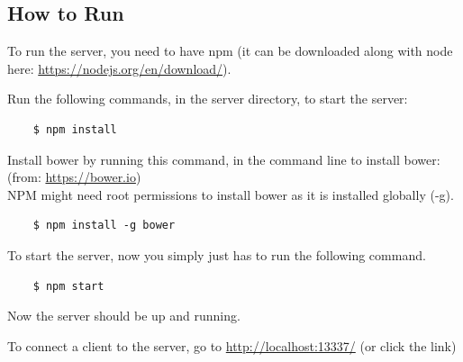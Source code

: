 \documentclass[a4paper]{article}
\begin{document}
\begin{appendices}
\section{How to Run}
\label{app_h2r}
To run the server, you need to have npm (it can be downloaded along with
  node here: \url{https://nodejs.org/en/download/}).

Run the following commands, in the server directory, to start the server:
\begin{verbatim}
	$ npm install
\end{verbatim}
  
Install bower by running this command, in the command line to install
bower: (from: \url{https://bower.io})\\
NPM might need root permissions to install bower as it is installed globally (-g).

\begin{verbatim}
	$ npm install -g bower
\end{verbatim}

To start the server, now you simply just has to run the following command.

\begin{verbatim}
	$ npm start
\end{verbatim}

Now the server should be up and running.

To connect a client to the server, go to \url{http://localhost:13337/} (or click the link)
\end{appendices}
\end{document}
